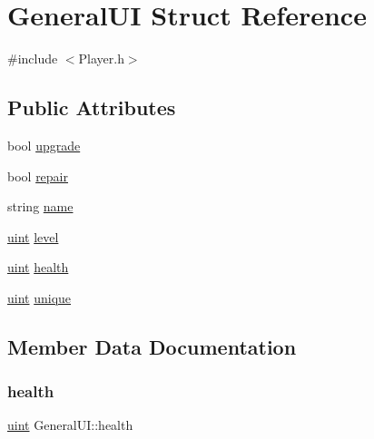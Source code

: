 \hypertarget{struct_general_u_i}{}\section{General\+UI Struct Reference}
\label{struct_general_u_i}


{\ttfamily \#include $<$Player.\+h$>$}

\subsection*{Public Attributes}
\begin{DoxyCompactItemize}
\item 
bool \mbox{\hyperlink{struct_general_u_i_a8b88aa193d1e1baa9db18fd3c393f727}{upgrade}}
\item 
bool \mbox{\hyperlink{struct_general_u_i_a5a70fedd549c4ff917675581d4bf1b1b}{repair}}
\item 
string \mbox{\hyperlink{struct_general_u_i_a31960639cc6a992ae6a2e23c8931c447}{name}}
\item 
\mbox{\hyperlink{_defs_8h_a91ad9478d81a7aaf2593e8d9c3d06a14}{uint}} \mbox{\hyperlink{struct_general_u_i_a21d18f2119eda444cf7171d3eb1fa32c}{level}}
\item 
\mbox{\hyperlink{_defs_8h_a91ad9478d81a7aaf2593e8d9c3d06a14}{uint}} \mbox{\hyperlink{struct_general_u_i_a23a2d38f30d40f1a059645a1ce55994d}{health}}
\item 
\mbox{\hyperlink{_defs_8h_a91ad9478d81a7aaf2593e8d9c3d06a14}{uint}} \mbox{\hyperlink{struct_general_u_i_adc0614033f612f2c6120cd2fc011ecbd}{unique}}
\end{DoxyCompactItemize}


\subsection{Member Data Documentation}
\mbox{\label{struct_general_u_i_a23a2d38f30d40f1a059645a1ce55994d}} 
\subsubsection{\texorpdfstring{health}{health}}
{\footnotesize\ttfamily \mbox{\hyperlink{_defs_8h_a91ad9478d81a7aaf2593e8d9c3d06a14}{uint}} General\+U\+I\+::health}

\mbox{\label{struct_general_u_i_a21d18f2119eda444cf7171d3eb1fa32c}} 
